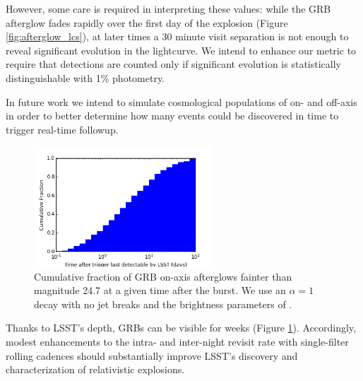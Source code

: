 However, some care is required in interpreting these values:
while the GRB afterglow fades rapidly over the first day of the explosion
(Figure \ref{fig:afterglow_lcs}), at later times a 30 minute visit
separation is not enough to reveal significant evolution in the lightcurve.
We intend to enhance our metric to require that detections are counted only
if significant evolution is statistically distinguishable with 1\%
photometry.

In future work we intend to simulate cosmological populations of on- and
off-axis in order to better determine how many events could be discovered
in time to trigger real-time followup.

\begin{figure}[hbt]
\centerline{
\includegraphics[width=0.6\textwidth]{figs/transients/afterglow_cdf.png}
}
\caption{ Cumulative fraction of GRB on-axis afterglows fainter than
magnitude 24.7 at a given time after the burst. We use an $\alpha=1$
decay with no jet breaks and the brightness parameters of
\citet{2011PASP..123.1034J}. }
\label{fig:afterglow_visibility}
\end{figure}

Thanks to LSST's depth, GRBs can be visible for weeks (Figure
\ref{fig:afterglow_visibility}).  Accordingly,
modest enhancements to the intra- and inter-night revisit rate with
single-filter rolling cadences should substantially improve LSST's
discovery and characterization of relativistic explosions.


